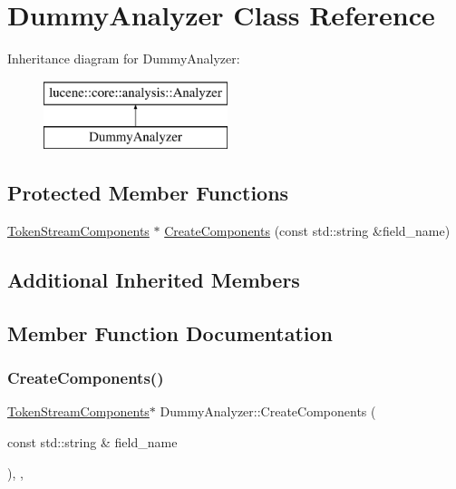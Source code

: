 \hypertarget{classDummyAnalyzer}{}\section{Dummy\+Analyzer Class Reference}
\label{classDummyAnalyzer}
Inheritance diagram for Dummy\+Analyzer\+:\begin{figure}[H]
\begin{center}
\leavevmode
\includegraphics[height=2.000000cm]{classDummyAnalyzer}
\end{center}
\end{figure}
\subsection*{Protected Member Functions}
\begin{DoxyCompactItemize}
\item 
\mbox{\hyperlink{classlucene_1_1core_1_1analysis_1_1TokenStreamComponents}{Token\+Stream\+Components}} $\ast$ \mbox{\hyperlink{classDummyAnalyzer_aeeb24aa6449d4bf7c4adc6a5c63a5c0e}{Create\+Components}} (const std\+::string \&field\+\_\+name)
\end{DoxyCompactItemize}
\subsection*{Additional Inherited Members}


\subsection{Member Function Documentation}
\mbox{\label{classDummyAnalyzer_aeeb24aa6449d4bf7c4adc6a5c63a5c0e}} 
\subsubsection{\texorpdfstring{Create\+Components()}{CreateComponents()}}
{\footnotesize\ttfamily \mbox{\hyperlink{classlucene_1_1core_1_1analysis_1_1TokenStreamComponents}{Token\+Stream\+Components}}$\ast$ Dummy\+Analyzer\+::\+Create\+Components (\begin{DoxyParamCaption}\item[{const std\+::string \&}]{field\+\_\+name }\end{DoxyParamCaption})\hspace{0.3cm}{\ttfamily [inline]}, {\ttfamily [protected]}, {\ttfamily [virtual]}}



